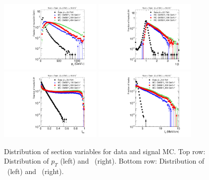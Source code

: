 \begin{figure}
\centering
  \includegraphics[clip=true, trim=0.0cm 0cm 2.8cm 0cm, width=0.44\textwidth]{figures/tkmu/Selection_Comp_8TeV_GMStau_Pt_BS}
  \includegraphics[clip=true, trim=0.0cm 0cm 2.8cm 0cm, width=0.44\textwidth]{figures/tkmu/Selection_Comp_8TeV_GMStau_TOF_BS} \\
  \includegraphics[clip=true, trim=0.0cm 0cm 2.8cm 0cm, width=0.44\textwidth]{figures/tkmu/Selection_Comp_8TeV_GMStau_Is_BS}
  \includegraphics[clip=true, trim=0.0cm 0cm 2.8cm 0cm, width=0.44\textwidth]{figures/tkmu/Selection_Comp_8TeV_GMStau_Im_BS}
  \caption[Distribution of selection variables in the \tktof\ analysis for data and signal MC.]
{Distribution of section variables for data and signal MC.
Top row: Distribution of $p_T$ (left) and \invbeta\ (right).
Bottom row: Distribution of \ias\ (left) and \ih\ (right).}
    \label{fig:TkMuSelVar}
\end{figure}

